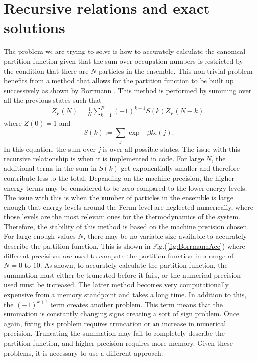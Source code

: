 \section{Recursive relations and exact solutions}
The problem we are trying to solve is how to accurately calculate the canonical partition function given that the sum over occupation numbers is restricted by the condition that there are $N$ particles in the ensemble. This non-trivial problem benefits from a method that allows for the partition function to be built up successively as shown by Borrmann \cite{Borr1993}. This method is performed by summing over all the previous states such that 
\begin{gather}
    Z_F(N)=\frac{1}{N}\sum_{k=1}^N (-1)^{k+1} S(k)Z_F(N-k). \label{Borrmann}
\end{gather}
where $Z(0)=1$ and 
\begin{equation}
    S(k):=\sum_j \exp{-\beta k \epsilon(j)}.
\end{equation}
In this equation, the sum over $j$ is over all possible states. The issue with this recursive relationship is when it is implemented in code. For large $N$, the additional terms in the sum in $S(k)$ get exponentially smaller and therefore contribute less to the total. Depending on the machine precision, the higher energy terms may be considered to be zero compared to the lower energy levels. The issue with this is when the number of particles in the ensemble is large enough that energy levels around the Fermi level are neglected numerically, where those levels are the most relevant ones for the thermodynamics of the system. Therefore, the stability of this method is based on the machine precision chosen. For large enough values $N$, there may be no variable size available to accurately describe the partition function. This is shown in Fig.\@ (\ref{fig:BorrmannAcc}) where different precisions are used to compute the partition function in a range of $N=0$ to $10$.
As shown, to accurately calculate the partition function, the summation must either be truncated before it fails, or the numerical precision used must be increased. The latter method becomes very computationally expensive from a memory standpoint and takes a long time. 
In addition to this, the $(-1)^{k+1}$ term creates another problem. This term means that the summation is constantly changing signs creating a sort of sign problem. Once again, fixing this problem requires truncation or an increase in numerical precision. Truncating the summation may fail to completely describe the partition function, and higher precision requires more memory. Given these problems, it is necessary to use a different approach. 


